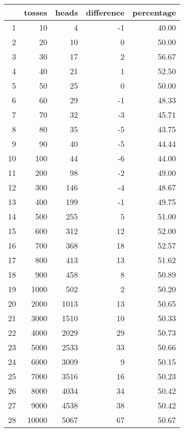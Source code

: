 \documentclass[letterpaper]{exam}
\begin{document}
  \begin{table}[H]
  \centering
    \begin{tabular}{rrrrr}
      \toprule
          & tosses & heads & difference & percentage \\
      \midrule
      1   & 10     & 4     & -1         & 40.00 \\
      2   & 20     & 10    & 0          & 50.00 \\
      3   & 30     & 17    & 2          & 56.67 \\
      4   & 40     & 21    & 1          & 52.50 \\
      5   & 50     & 25    & 0          & 50.00 \\
      6   & 60     & 29    & -1         & 48.33 \\
      7   & 70     & 32    & -3         & 45.71 \\
      8   & 80     & 35    & -5         & 43.75 \\
      9   & 90     & 40    & -5         & 44.44 \\
      10  & 100    & 44    & -6         & 44.00 \\
      11  & 200    & 98    & -2         & 49.00 \\
      12  & 300    & 146   & -4         & 48.67 \\
      13  & 400    & 199   & -1         & 49.75 \\
      14  & 500    & 255   & 5          & 51.00 \\
      15  & 600    & 312   & 12         & 52.00 \\
      16  & 700    & 368   & 18         & 52.57 \\
      17  & 800    & 413   & 13         & 51.62 \\
      18  & 900    & 458   & 8          & 50.89 \\
      19  & 1000   & 502   & 2          & 50.20 \\
      20  & 2000   & 1013  & 13         & 50.65 \\
      21  & 3000   & 1510  & 10         & 50.33 \\
      22  & 4000   & 2029  & 29         & 50.73 \\
      23  & 5000   & 2533  & 33         & 50.66 \\
      24  & 6000   & 3009  & 9          & 50.15 \\
      25  & 7000   & 3516  & 16         & 50.23 \\
      26  & 8000   & 4034  & 34         & 50.42 \\
      27  & 9000   & 4538  & 38         & 50.42 \\
      28  & 10000  & 5067  & 67         & 50.67 \\
       \bottomrule
    \end{tabular}
  \end{table}
\end{document}
